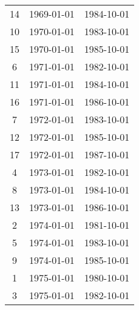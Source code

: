 % 
\begin{tabular}{ccc}
  \hline
  \hline
14 & 1969-01-01 & 1984-10-01 \\ 
  10 & 1970-01-01 & 1983-10-01 \\ 
  15 & 1970-01-01 & 1985-10-01 \\ 
  6 & 1971-01-01 & 1982-10-01 \\ 
  11 & 1971-01-01 & 1984-10-01 \\ 
  16 & 1971-01-01 & 1986-10-01 \\ 
  7 & 1972-01-01 & 1983-10-01 \\ 
  12 & 1972-01-01 & 1985-10-01 \\ 
  17 & 1972-01-01 & 1987-10-01 \\ 
  4 & 1973-01-01 & 1982-10-01 \\ 
  8 & 1973-01-01 & 1984-10-01 \\ 
  13 & 1973-01-01 & 1986-10-01 \\ 
  2 & 1974-01-01 & 1981-10-01 \\ 
  5 & 1974-01-01 & 1983-10-01 \\ 
  9 & 1974-01-01 & 1985-10-01 \\ 
  1 & 1975-01-01 & 1980-10-01 \\ 
  3 & 1975-01-01 & 1982-10-01 \\ 
   \hline
\end{tabular}

